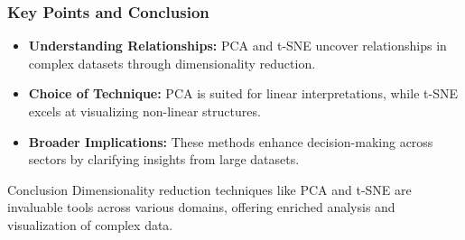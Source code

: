 \documentclass{beamer}
\begin{document}
\begin{frame}[fragile]
    \frametitle{Key Points and Conclusion}
    \begin{itemize}
        \item \textbf{Understanding Relationships:} PCA and t-SNE uncover relationships in complex datasets through dimensionality reduction.
        \item \textbf{Choice of Technique:} PCA is suited for linear interpretations, while t-SNE excels at visualizing non-linear structures.
        \item \textbf{Broader Implications:} These methods enhance decision-making across sectors by clarifying insights from large datasets.
    \end{itemize}
    
    \begin{block}{Conclusion}
        Dimensionality reduction techniques like PCA and t-SNE are invaluable tools across various domains, offering enriched analysis and visualization of complex data.
    \end{block}
\end{frame}
\end{document}
